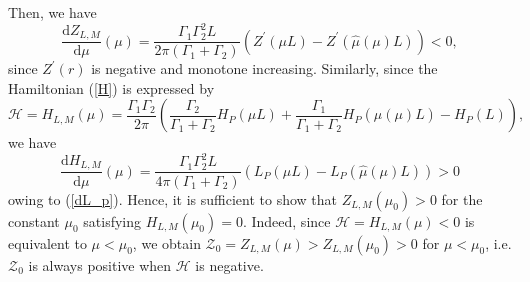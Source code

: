 \documentclass{article}
\theoremstyle{definition}
\begin{document}
Then, we have
\begin{equation*}
\frac{\mbox{d} Z_{L,M}}{\mbox{d} \mu} (\mu) = \frac{\Gamma_1 \Gamma_2^2 L}{2 \pi (\Gamma_1 + \Gamma_2)} \left( Z^\prime( \mu L) - Z^\prime(\widehat{\mu}(\mu) L)  \right) < 0,
\end{equation*}
since $Z^\prime(r)$ is negative and monotone increasing. Similarly, since the Hamiltonian (\ref{H}) is expressed by 
\begin{equation*}
\mathscr{H} = H_{L,M}(\mu) = \frac{\Gamma_1 \Gamma_2}{2 \pi} \left( \frac{\Gamma_2}{\Gamma_1 + \Gamma_2} H_P( \mu L) + \frac{\Gamma_1}{\Gamma_1 + \Gamma_2} H_P( \widehat{\mu}(\mu) L) - H_P(L) \right),
\end{equation*}
we have
\begin{equation*}
\frac{\mbox{d} H_{L,M}}{\mbox{d} \mu} (\mu) = \frac{\Gamma_1 \Gamma_2^2 L}{4 \pi (\Gamma_1 + \Gamma_2)} \left( L_P( \mu L) - L_P( \widehat{\mu}(\mu) L)  \right) > 0
\end{equation*}
 owing to (\ref{dL_p}). Hence, it is sufficient to show that $Z_{L,M}(\mu_0) > 0$ for the constant $\mu_0$ satisfying $H_{L,M}(\mu_0) = 0$. Indeed, since $\mathscr{H} = H_{L,M}(\mu) < 0$ is equivalent to $\mu < \mu_0$, we obtain $\mathscr{Z}_0 = Z_{L, M}(\mu) > Z_{L, M}(\mu_0) > 0$ for $\mu < \mu_0$, i.e. $\mathscr{Z}_0$ is always positive when $\mathscr{H}$ is negative.
\end{document}
